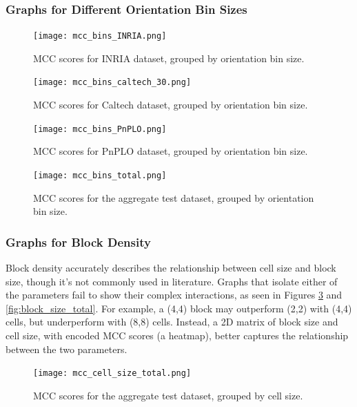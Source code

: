 \subsubsection{Graphs for Different Orientation Bin Sizes}

\begin{figure}
    \centering
    \texttt{[image: mcc\_bins\_INRIA.png]}
    \caption{
        MCC scores for INRIA dataset, grouped by orientation bin size.
    }
    \label{fig:orientation_bins_inria}
\end{figure}

\begin{figure}
    \centering
    \texttt{[image: mcc\_bins\_caltech\_30.png]}
    \caption{
        MCC scores for Caltech dataset, grouped by orientation bin size.
    }
\end{figure}

\begin{figure}
    \centering
    \texttt{[image: mcc\_bins\_PnPLO.png]}
    \caption{
        MCC scores for PnPLO dataset, grouped by orientation bin size.
    }
\end{figure}

\begin{figure}
    \centering
    \texttt{[image: mcc\_bins\_total.png]}
    \caption{
        MCC scores for the aggregate test dataset, grouped by orientation bin size.
    }
    \label{fig:orientation_bins_total}
\end{figure}


\subsubsection{Graphs for Block Density}

Block density accurately describes the relationship between cell size and block size, though it's not commonly used in literature. Graphs that isolate either of the parameters fail to show their complex interactions, as seen in Figures \ref{fig:cell_size_total} and \ref{fig:block_size_total}. For example, a (4,4) block may outperform (2,2) with (4,4) cells, but underperform with (8,8) cells. Instead, a 2D matrix of block size and cell size, with encoded MCC scores (a heatmap), better captures the relationship between the two parameters.

\begin{figure}
    \centering
    \texttt{[image: mcc\_cell\_size\_total.png]}
    \caption{
        MCC scores for the aggregate test dataset, grouped by cell size.
    }
    \label{fig:cell_size_total}
\end{figure}

